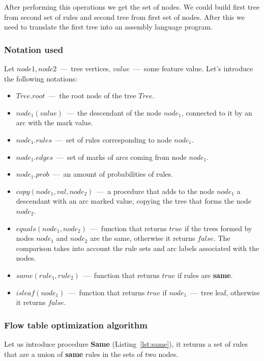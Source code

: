 \documentclass[conference]{IEEEtran}
\begin{document}
            After performing this operations we get the set of nodes. We could build first tree
            from second set of rules and second tree from first set of nodes. After this  we need to translate the
            first tree into an assembly language program.
            \subsubsection{Notation used}
            Let \(node1, node2\)~---~tree vertices, \(value\)~---~some feature value. Let’s introduce the following notations:
            \begin{itemize}
                \item \(Tree.root\)~---~the root node of the tree \(Tree\).
                \item \(node_1(value)\)~---~the descendant of the node \(node_1\), connected to it by an arc with the mark value.
                \item \(node_1.rules\)~---~set of rules corresponding to node \(node_1\).
                \item \(node_1.edges\)~---~set of marks of arcs coming from node \(node_1\).
                \item \(node_1.prob\)~---~an amount of probabilities of rules.
                \item \(copy(node_1, val, node_2)\)~---~a procedure that adds to the node \(node_1\) a descendant with an arc marked value, 
                    copying the tree that forms the node \(node_2\).
                \item \(equals(node_1, node_2)\)~---~function that returns \(true\) if the trees formed 
                    by nodes \(node_1\) and \(node_2\) are the same, otherwise it returns \(false\). 
                    The comparison takes into account the rule sets and arc labels associated with the nodes.
                \item \(same(rule_1, rule_2)\)~---~function that returns \(true\) if rules are \textbf{same}.
                \item \(isleaf(node_1)\)~---~function that returns \(true\) if \(node_1\)~---~tree leaf, otherwise it returns \(false\).
            \end{itemize}
            \subsubsection{Flow table optimization algorithm}
            Let us introduce procedure \textbf{Same} (Listing~\ref{lst:same}), it returns a set of rules that are a union of \textbf{same} rules in the sets of two nodes. 
\end{document}
